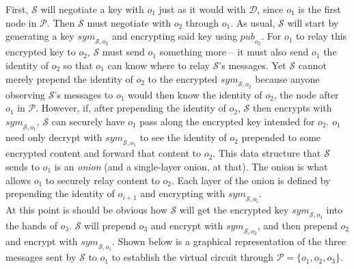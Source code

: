 \documentclass[10pt]{report}
\begin{document}
First, $\mathcal{S}$ will negotiate a key with $o_1$ just as it would with $\mathcal{D}$, since $o_1$ is the
first node in $\mathcal{P}$.  Then $\mathcal{S}$ must negotiate with $o_2$ through $o_1$. As usual, $\mathcal{S}$
will start by generating a key $\mathit{sym}_{\mathcal{S},o_2}$ and encrypting said key using $\mathit{pub}_{o_2}$.
For $o_1$ to relay this encrypted key to $o_2$, $\mathcal{S}$ must send $o_1$ something more -- it must also
send $o_1$ the identity of $o_2$ so that $o_1$ can know where to relay $\mathcal{S}$'s messages.  Yet
$\mathcal{S}$ cannot merely prepend the identity of $o_2$ to the encrypted $\mathit{sym}_{\mathcal{S},o_2}$
because anyone observing $\mathcal{S}$'s messages to $o_1$ would then know the identity of $o_2$, the node
after $o_1$ in $\mathcal{P}$.  However, if, after prepending the identity of $o_2$, $\mathcal{S}$ then encrypts with
$\mathit{sym}_{\mathcal{S},o_1}$, $\mathcal{S}$ can securely have $o_1$ pass along the encrypted key intended
for $o_2$.  $o_1$ need only decrypt with $\mathit{sym}_{\mathcal{S},o_1}$ to see the identity of $o_2$ prepended
to some encrypted content and forward that content to $o_2$.  This data structure that $\mathcal{S}$ sends to
$o_1$ is an \textit{onion} (and a single-layer onion, at that).  The onion is what allows $o_1$ to securely
relay content to $o_2$.  Each layer of the onion is defined by prepending the identity of $o_{i+1}$ and encrypting
with $\mathit{sym}_{\mathcal{S}, o_i}$.\\

At this point is should be obvious how $\mathcal{S}$ will get the encrypted key $\mathit{sym}_{\mathcal{S},o_3}$
into the hands of $o_3$.  $\mathcal{S}$ will prepend $o_3$ and encrypt with
$\mathit{sym}_{\mathcal{S},o_2}$, and then prepend $o_2$ and encrypt with $\mathit{sym}_{\mathcal{S},o_1}$.
Shown below is a graphical representation of the three messages sent by $\mathcal{S}$ to $o_1$ to establish
the virtual circuit through $\mathcal{P} = \{o_1, o_2, o_3\}$.
\end{document}
